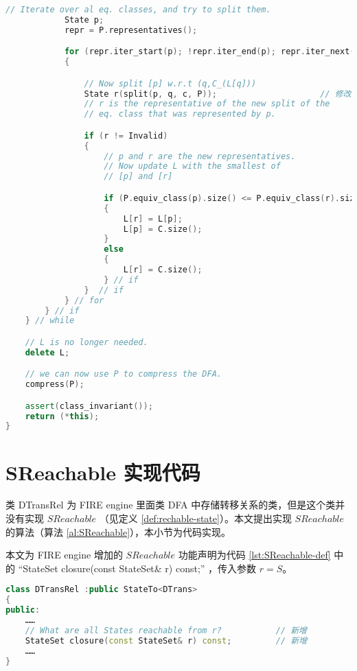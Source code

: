 \begin{lstlisting}[language=C++,label={lst:hop},caption={文件 min-hop.cpp}]
            // Iterate over al eq. classes, and try to split them.
            State p;
            repr = P.representatives();

            for (repr.iter_start(p); !repr.iter_end(p); repr.iter_next(p))
            {

                // Now split [p] w.r.t (q,C_(L[q]))
                State r(split(p, q, c, P));                     // 修改
                // r is the representative of the new split of the 
                // eq. class that was represented by p.

                if (r != Invalid)
                {
                    // p and r are the new representatives.
                    // Now update L with the smallest of
                    // [p] and [r]

                    if (P.equiv_class(p).size() <= P.equiv_class(r).size())
                    {
                        L[r] = L[p];
                        L[p] = C.size();
                    }
                    else
                    {
                        L[r] = C.size();
                    } // if
                }  // if
            } // for
        } // if
    } // while

    // L is no longer needed.
    delete L;

    // we can now use P to compress the DFA.
    compress(P);

    assert(class_invariant());
    return (*this);
}
\end{lstlisting}


\section{SReachable 实现代码}\label{sec:SReachable-imp}

类 DTransRel 为 FIRE engine 里面类 DFA 中存储转移关系的类，但是这个类并没有实现 $SReachable$ （见定义 \ref{def:rechable-state}）。本文提出实现 $SReachable$ 的算法（算法 \ref{al:SReachable}），本小节为代码实现。

本文为 FIRE engine 增加的 $SReachable$ 功能声明为代码 \ref{lst:SReachable-def} 中的 “StateSet closure(const StateSet\& r) const;” ，传入参数 $r=S$。

\begin{lstlisting}[language=C++,label={lst:SReachable-def},caption={文件 DTransRel.h}]
class DTransRel :public StateTo<DTrans>
{
public:
    ……
    // What are all States reachable from r?           // 新增
    StateSet closure(const StateSet& r) const;         // 新增
    ……
}
\end{lstlisting}

